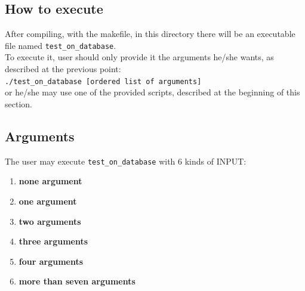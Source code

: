 \documentclass[10pt]{article}
\begin{document}
\subsection{How to execute}

After compiling, with the makefile, in this directory there will be an executable file named {\tt test\_on\_database}.\\
To execute it, user should only provide it the arguments he/she wants, as described at the previous point:\\

{\tt ./test\_on\_database [ordered list of arguments]}\\

or he/she may use one of the provided scripts, described at the beginning of this section.


\subsection{Arguments}

The user may execute {\tt test\_on\_database} with 6 kinds of INPUT:
\begin{enumerate}
 \item \textbf{none argument}
 \item \textbf{one argument}
 \item \textbf{two arguments}
 \item \textbf{three arguments}
 \item \textbf{four arguments}
 \item \textbf{more than seven arguments}
\end{enumerate}
\end{document}
